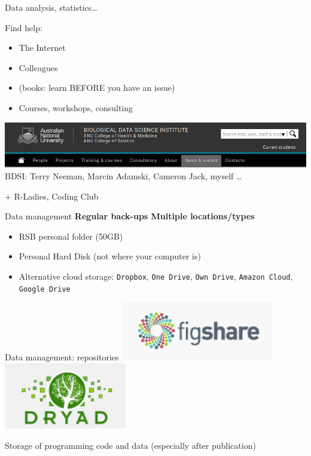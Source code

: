 \documentclass[10pt]{beamer}%
\begin{document}
\begin{frame}{Data analysis, statistics\dots }
    \begin{block}{Find help:}
        \begin{itemize}
         \item The Internet
         \item Colleagues
         \item (books: learn BEFORE you have an issue)
         \item Courses, workshops, consulting
        \end{itemize}
  \pause  
    \includegraphics[width=\textwidth]{Figures/bdsi}
    BDSI: Terry Neeman, Marcin Adamski, Cameron Jack, myself \dots
    \end{block}
\pause
    \alert{\large + R-Ladies, Coding Club}
\end{frame}

\begin{frame}{Data management}
    \textbf{\large \alert{Regular back-ups} \hfill \alert{Multiple locations/types}}

\begin{itemize}
 \item  RSB personal folder (50GB)
    \item Personal Hard Disk (not where your computer is)
    \item Alternative cloud storage: \texttt{Dropbox}, \texttt{One Drive}, \texttt{Own Drive},  \texttt{Amazon Cloud}, \texttt{Google Drive}
\end{itemize}

\end{frame}


\begin{frame}{Data management: repositories}
\includegraphics[width=0.5\textwidth]{Figures/repo1}
\includegraphics[width=0.4\textwidth]{Figures/repo2}

\Large
Storage of programming code and data  (especially after publication)
\end{frame}
\end{document}
